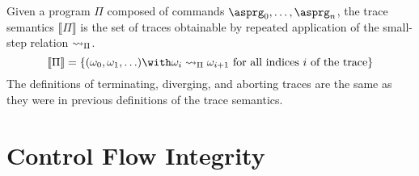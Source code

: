 \documentclass[11pt,twoside]{scrartcl}
\begin{document}
\begin{definition}
Given a program $\Pi$ composed of commands $\asprg_0,\ldots,\asprg_n$, the trace semantics $\llbracket\Pi\rrbracket$ is the set of traces obtainable by repeated application of the small-step relation $\rightsquigarrow_\Pi$.
\[
\llbracket\Pi\rrbracket =
\{
(\omega_0,\omega_1,\ldots) \with \omega_{i} \smallstep_\Pi \omega_{i+1}~\text{for all indices}~i~\text{of the trace}
\}
\]
The definitions of terminating, diverging, and aborting traces are the same as they were in previous definitions of the trace semantics.
\end{definition}

\section{Control Flow Integrity}
\end{document}
